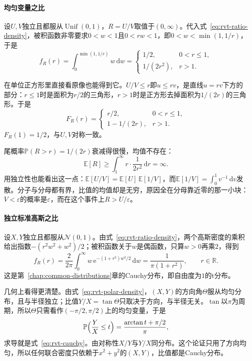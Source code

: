 \paragraph{均匀变量之比}
设$U,V$独立且都服从$\operatorname{Unif}(0,1)$，$R=U/V$取值于$(0,\infty)$。代入式~\eqref{eq:rvt-ratio-density}，被积函数非零要求$0<w<1$且$0<rw<1$，即$0<w<\min(1,1/r)$，于是
\[
 f_R(r)=\int_0^{\min(1,1/r)}w\,\mathrm{d}w=
 \begin{cases}
  1/2, & 0<r\leq1,\\
  1/(2r^2), & r>1 .
 \end{cases}
\]

在单位正方形里直接看原像也能得到它。$U/V\leq r$即$u\leq rv$，是直线$u=rv$下方的部分：$r\leq1$时是面积为$r/2$的三角形，$r>1$时是正方形去掉面积为$1/(2r)$的三角形。于是
\[
 F_R(r)=
 \begin{cases}
  r/2, & 0<r\leq1,\\
  1-1/(2r), & r>1 .
 \end{cases}
\]
$F_R(1)=1/2$，与$U,V$对称一致。

尾概率$\mathbb{P}(R>r)=1/(2r)$衰减得很慢，均值不存在：
\[
 \mathbb{E}[R]\geq\int_1^\infty r\cdot\frac{1}{2r^2}\,\mathrm{d}r=\infty .
\]
用独立性也能看出这一点：$\mathbb{E}[U/V]=\mathbb{E}[U]\,\mathbb{E}[1/V]$，而$\mathbb{E}[1/V]=\int_0^1v^{-1}\,\mathrm{d}v$发散。分子与分母都有界，比值的均值却是无穷，原因全在分母靠近零的那一小块：$V<\varepsilon$的概率是$\varepsilon$，而在这个事件上$R>U/\varepsilon$。

\paragraph{独立标准高斯之比}
设$X,Y$独立且都服从$\mathcal{N}(0,1)$。由式~\eqref{eq:rvt-ratio-density}，两个高斯密度的乘积给出指数$-(r^2w^2+w^2)/2$；被积函数关于$w$是偶函数，只算$w>0$再乘$2$，得到
\begin{equation}
 f_R(r)=\frac{2}{2\pi}\int_0^\infty w\,\mathrm{e}^{-(1+r^2)w^2/2}\,\mathrm{d}w=\frac{1}{\pi(1+r^2)},\qquad r\in\mathbb{R} .
 \label{eq:rvt-cauchy}
\end{equation}
这是第~\ref{chap:common-distributions}章的Cauchy分布，即自由度为$1$的t分布。

几何上看得更清楚。由式~\eqref{eq:rvt-polar-density}，$(X,Y)$的方向角$\Theta$服从均匀分布，且与半径独立；比值$Y/X=\tan\Theta$只取决于方向，与半径无关。$\tan$以$\pi$为周期，所以$\Theta$只需看作$(-\pi/2,\pi/2)$上的均匀变量，于是
\[
 \mathbb{P}\Bigl(\frac YX\leq t\Bigr)=\frac{\arctan t+\pi/2}{\pi} ,
\]
求导就是式~\eqref{eq:rvt-cauchy}。由对称性$X/Y$与$Y/X$同分布。这个论证只用了方向均匀，所以任何联合密度只依赖于$x^2+y^2$的$(X,Y)$，比值都是Cauchy分布。

